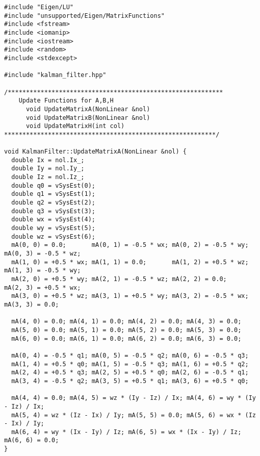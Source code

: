 \documentclass[class=article, crop=false, dvipdfmx, fleqn]{standalone}
\begin{document}
\newpage

\newpage


\newpage

\newpage

\begin{lstlisting}[caption=kalman$\_$filter.cpp (カルマンフィルタ用クラス(source))]
#include "Eigen/LU"
#include "unsupported/Eigen/MatrixFunctions"
#include <fstream>
#include <iomanip>
#include <iostream>
#include <random>
#include <stdexcept>

#include "kalman_filter.hpp"

/***********************************************************
    Update Functions for A,B,H
      void UpdateMatrixA(NonLinear &nol)
      void UpdateMatrixB(NonLinear &nol)
      void UpdateMatrixH(int col)
**********************************************************/

void KalmanFilter::UpdateMatrixA(NonLinear &nol) {
  double Ix = nol.Ix_;
  double Iy = nol.Iy_;
  double Iz = nol.Iz_;
  double q0 = vSysEst(0);
  double q1 = vSysEst(1);
  double q2 = vSysEst(2);
  double q3 = vSysEst(3);
  double wx = vSysEst(4);
  double wy = vSysEst(5);
  double wz = vSysEst(6);
  mA(0, 0) = 0.0;       mA(0, 1) = -0.5 * wx; mA(0, 2) = -0.5 * wy; mA(0, 3) = -0.5 * wz;
  mA(1, 0) = +0.5 * wx; mA(1, 1) = 0.0;       mA(1, 2) = +0.5 * wz; mA(1, 3) = -0.5 * wy;
  mA(2, 0) = +0.5 * wy; mA(2, 1) = -0.5 * wz; mA(2, 2) = 0.0;       mA(2, 3) = +0.5 * wx;
  mA(3, 0) = +0.5 * wz; mA(3, 1) = +0.5 * wy; mA(3, 2) = -0.5 * wx; mA(3, 3) = 0.0;

  mA(4, 0) = 0.0; mA(4, 1) = 0.0; mA(4, 2) = 0.0; mA(4, 3) = 0.0;
  mA(5, 0) = 0.0; mA(5, 1) = 0.0; mA(5, 2) = 0.0; mA(5, 3) = 0.0;
  mA(6, 0) = 0.0; mA(6, 1) = 0.0; mA(6, 2) = 0.0; mA(6, 3) = 0.0;

  mA(0, 4) = -0.5 * q1; mA(0, 5) = -0.5 * q2; mA(0, 6) = -0.5 * q3;
  mA(1, 4) = +0.5 * q0; mA(1, 5) = -0.5 * q3; mA(1, 6) = +0.5 * q2;
  mA(2, 4) = +0.5 * q3; mA(2, 5) = +0.5 * q0; mA(2, 6) = -0.5 * q1;
  mA(3, 4) = -0.5 * q2; mA(3, 5) = +0.5 * q1; mA(3, 6) = +0.5 * q0;

  mA(4, 4) = 0.0; mA(4, 5) = wz * (Iy - Iz) / Ix; mA(4, 6) = wy * (Iy - Iz) / Ix;
  mA(5, 4) = wz * (Iz - Ix) / Iy; mA(5, 5) = 0.0; mA(5, 6) = wx * (Iz - Ix) / Iy;
  mA(6, 4) = wy * (Ix - Iy) / Iz; mA(6, 5) = wx * (Ix - Iy) / Iz; mA(6, 6) = 0.0;
}


\end{lstlisting}
\end{document}
